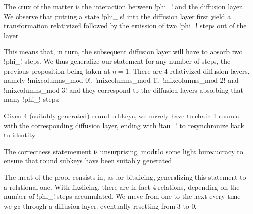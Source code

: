 \documentclass[draft,english]{jflart}
\begin{document}

The crux of the matter is the interaction between \coqe!phi_! and the
diffusion layer. We observe that putting a state \coqe!phi_ s! into
the diffusion layer first yield a transformation relativized followed
by the emission of two \coqe!phi_! steps out of the layer:
%
\begin{coro}
\end{coro}


This means that, in turn, the subsequent diffusion layer will have to
absorb two \coqe!phi_! steps. We thus generalize our statement for any
number of steps, the previous proposition being taken at $n = 1$.
There are 4 relativized diffusion layers, namely 
%
\coqe!mixcolumns_mod 0!,
%
\coqe!mixcolumns_mod 1!,
%
\coqe!mixcolumns_mod 2!
%
and
%
\coqe!mixcolumns_mod 3!
%
%
and they correspond to the diffusion layers absorbing that many
\coqe!phi_! steps:
%
\begin{prop}
\end{prop}



Given 4 (suitably generated) round subkeys, we merely have to chain 4
rounds with the corresponding diffusion layer, ending with \coqe!tau_!
to resynchronize back to identity
%


The correctness statemement is unsurprising, modulo some light
bureaucracy to ensure that round subkeys have been suitably generated
%
\begin{theo}
\end{theo}

The meat of the proof consists in, as for bitslicing, generalizing
this statement to a relational one. With fixslicing, there are in fact
4 relations, depending on the number of \coqe!phi_! steps accumulated.
We move from one to the next every time we go through a diffusion
layer, eventually resetting from 3 to 0.
\end{document}
